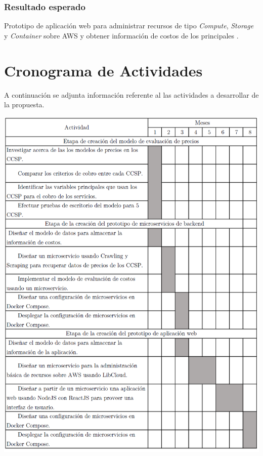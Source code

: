 \subsubsection{Resultado esperado}
Prototipo de aplicación web para administrar recursos de tipo \emph{Compute}, \emph{Storage} y \emph{Container} sobre \acrshort{AWS} y obtener información de costos de los principales .

\newpage
\section{Cronograma de Actividades}
A continuación se adjunta información referente al las actividades a desarrollar de la propuesta.
\begin{center}
    \includegraphics[width=\textwidth]{gfx/actividades3.png}
\end{center}

